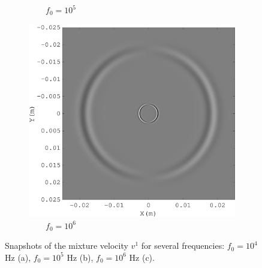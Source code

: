 \documentclass[3p,times,table]{article}
\begin{document}
\begin{figure}[!htbp]
\begin{subfigure}{0.3\linewidth}
\caption{$\quad\quad f_0=10^{5} $}
\end{subfigure}%
\hfill
\begin{subfigure}{0.3\linewidth}
\includegraphics[draft=false,width=1\textwidth]{Figures/frec_big_10_6}
\caption{$\quad\quad f_0=10^{6} $}
\end{subfigure}%
\caption{  Snapshots of the mixture velocity $v^1$ for several frequencies: 
$f_0=10^{4}$ Hz (a), $f_0=10^{5}$ Hz (b), $f_0=10^{6}$ Hz (c).  }
\label{fig:compare_frewuency}
\end{figure}
\end{document}

